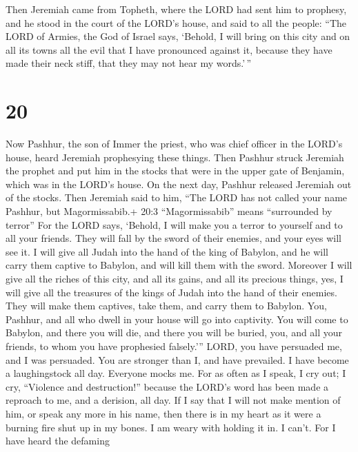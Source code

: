  Then Jeremiah came from Topheth, where the LORD had sent
him to prophesy, and he stood in the court of the LORD's house, and said
to all the people:  ``The LORD of Armies, the God of Israel
says, `Behold, I will bring on this city and on all its towns all the
evil that I have pronounced against it, because they have made their
neck stiff, that they may not hear my words.'\,''

\hypertarget{section-19}{%
\section{20}\label{section-19}}

 Now Pashhur, the son of Immer the priest, who was chief
officer in the LORD's house, heard Jeremiah prophesying these things.
 Then Pashhur struck Jeremiah the prophet and put him in the
stocks that were in the upper gate of Benjamin, which was in the LORD's
house.  On the next day, Pashhur released Jeremiah out of
the stocks. Then Jeremiah said to him, ``The LORD has not called your
name Pashhur, but Magormissabib.+ 20:3 ``Magormissabib'' means
``surrounded by terror''  For the LORD says, `Behold, I will
make you a terror to yourself and to all your friends. They will fall by
the sword of their enemies, and your eyes will see it. I will give all
Judah into the hand of the king of Babylon, and he will carry them
captive to Babylon, and will kill them with the sword. 
Moreover I will give all the riches of this city, and all its gains, and
all its precious things, yes, I will give all the treasures of the kings
of Judah into the hand of their enemies. They will make them captives,
take them, and carry them to Babylon.  You, Pashhur, and all
who dwell in your house will go into captivity. You will come to
Babylon, and there you will die, and there you will be buried, you, and
all your friends, to whom you have prophesied falsely.''' 
LORD, you have persuaded me, and I was persuaded. You are stronger than
I, and have prevailed. I have become a laughingstock all day. Everyone
mocks me.  For as often as I speak, I cry out; I cry,
``Violence and destruction!'' because the LORD's word has been made a
reproach to me, and a derision, all day.  If I say that I
will not make mention of him, or speak any more in his name, then there
is in my heart as it were a burning fire shut up in my bones. I am weary
with holding it in. I can't.  For I have heard the defaming
